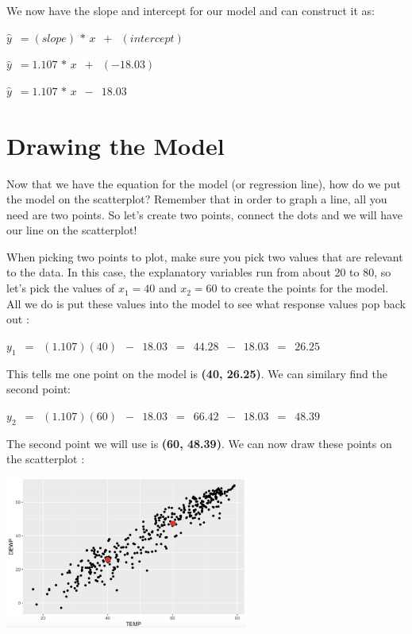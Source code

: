 \documentclass[
  letterpaper,
  DIV=11,
  numbers=noendperiod]{scrreprt}
\begin{document}
We now have the slope and intercept for our model and can construct it
as:

\(\displaystyle{\hat{y} \,\,\, = (slope)\,*\, x \,\,\, + \,\,\, (intercept)}\)

\(\displaystyle{\hat{y} \,\,\, = 1.107\,*\, x \,\,\, + \,\,\, (-18.03)}\)

\(\displaystyle{\hat{y} \,\,\, = 1.107\,*\, x \,\,\, - \,\,\, 18.03}\)

\section*{Drawing the Model}\label{drawing-the-model}


Now that we have the equation for the model (or regression line), how do
we put the model on the scatterplot? Remember that in order to graph a
line, all you need are two points. So let's create two points, connect
the dots and we will have our line on the scatterplot!

When picking two points to plot, make sure you pick two values that are
relevant to the data. In this case, the explanatory variables run from
about 20 to 80, so let's pick the values of \(x_1 = 40\) and
\(x_2 = 60\) to create the points for the model. All we do is put these
values into the model to see what response values pop back out :

\(\displaystyle{y_1 \,\,\, = \,\,\,(1.107)(40)\,\,\, -\,\,\, 18.03\,\,\,
= \,\,\, 44.28 \,\,\,-\,\,\,18.03\,\,\,=\,\,\,26.25}\)

This tells me one point on the model is \textbf{(40, 26.25)}. We can
similary find the second point:

\(\displaystyle{y_2 \,\,\, = \,\,\,(1.107)(60)\,\,\, -\,\,\, 18.03\,\,\,
= \,\,\, 66.42 \,\,\,-\,\,\,18.03\,\,\,=\,\,\,48.39}\)

The second point we will use is \textbf{(60, 48.39)}. We can now draw
these points on the scatterplot :

\includegraphics[width=0.6\textwidth,height=\textheight]{./images/LMR_6.jpg}
\end{document}
